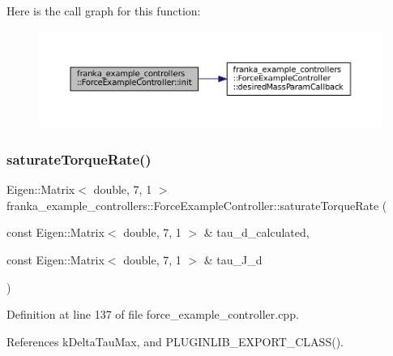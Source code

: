 Here is the call graph for this function\+:
\nopagebreak
\begin{figure}[H]
\begin{center}
\leavevmode
\includegraphics[width=350pt]{classfranka__example__controllers_1_1ForceExampleController_adb9839ab5bf49901849839bb5ce73932_cgraph}
\end{center}
\end{figure}
\mbox{\label{classfranka__example__controllers_1_1ForceExampleController_ac00e2f9f34f52e96a61e9d694e09fbd7}} 
\subsubsection{\texorpdfstring{saturate\+Torque\+Rate()}{saturateTorqueRate()}}
{\footnotesize\ttfamily Eigen\+::\+Matrix$<$ double, 7, 1 $>$ franka\+\_\+example\+\_\+controllers\+::\+Force\+Example\+Controller\+::saturate\+Torque\+Rate (\begin{DoxyParamCaption}\item[{const Eigen\+::\+Matrix$<$ double, 7, 1 $>$ \&}]{tau\+\_\+d\+\_\+calculated,  }\item[{const Eigen\+::\+Matrix$<$ double, 7, 1 $>$ \&}]{tau\+\_\+\+J\+\_\+d }\end{DoxyParamCaption})\hspace{0.3cm}{\ttfamily [private]}}



Definition at line 137 of file force\+\_\+example\+\_\+controller.\+cpp.



References k\+Delta\+Tau\+Max, and P\+L\+U\+G\+I\+N\+L\+I\+B\+\_\+\+E\+X\+P\+O\+R\+T\+\_\+\+C\+L\+A\+S\+S().



